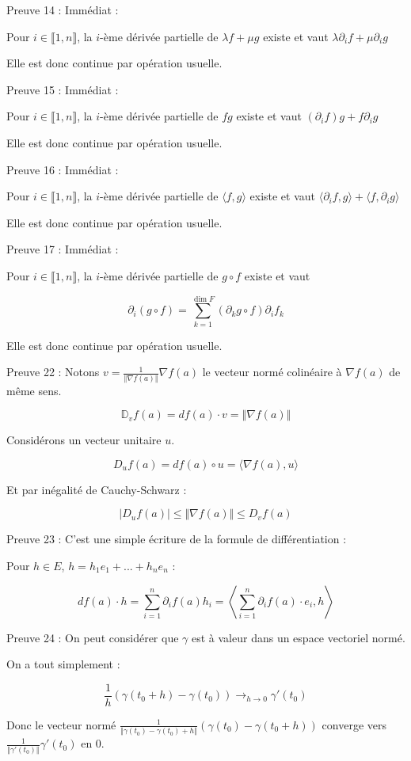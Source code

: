 \documentclass[a4paper,12pt]{book}
\newcommand{\Pre}[1]{\begin{tcolorbox}[sharp corners, colback=white,colframe=green!60!green!30!black!75, title=Preuve]#1\end{tcolorbox}}
\def\D{\mathbb{D}}
\begin{document}
\Pre{Preuve 14 : Immédiat : 
\par Pour $i\in\llbracket 1, n\rrbracket$, la $i$-ème dérivée partielle de $\lambda f+\mu g$ existe et vaut $\lambda\partial_if + \mu\partial_ig$
\par Elle est donc continue par opération usuelle.}
\Pre{Preuve 15 : Immédiat :
\par Pour $i\in\llbracket 1, n\rrbracket$, la $i$-ème dérivée partielle de $fg$ existe et vaut $(\partial_if)g + f\partial_ig$
\par Elle est donc continue par opération usuelle.}
\Pre{Preuve 16 : Immédiat :
\par Pour $i\in\llbracket 1, n\rrbracket$, la $i$-ème dérivée partielle de $\langle f,g\rangle$ existe et vaut $\langle \partial_if,g\rangle + \langle f,\partial_ig\rangle$
\par Elle est donc continue par opération usuelle.}
\Pre{Preuve 17 : Immédiat :
\par Pour $i\in\llbracket 1, n\rrbracket$, la $i$-ème dérivée partielle de $g\circ f$ existe et vaut
\par $$\partial_i (g\circ f) = \sum\limits_{k=1}^{\dim F} (\partial_kg\circ f)\partial_if_k$$
\par Elle est donc continue par opération usuelle.}
\Pre{Preuve 22 : Notons $v = \frac{1}{\Vert\nabla f(a)\Vert}\nabla f(a)$ le vecteur normé colinéaire à $\nabla f(a)$ de même sens.
\par $$\D_vf(a) = df(a)\cdot v = \Vert\nabla f(a)\Vert$$
\par Considérons un vecteur unitaire $u$.
\par $$D_uf(a) = df(a)\circ u = \langle \nabla f(a), u\rangle$$
\par Et par inégalité de Cauchy-Schwarz :
\par $$\vert D_uf(a)\vert\leq \Vert\nabla f(a)\Vert \leq D_vf(a)$$}
\Pre{Preuve 23 : C'est une simple écriture de la formule de différentiation :
\par Pour $h\in E$, $h= h_1e_1+...+h_ne_n$ :
\par $$df(a)\cdot h =\sum\limits_{i=1}^n\partial_if(a)h_i = \left\langle\sum\limits_{i=1}^n\partial_if(a)\cdot e_i, h\right\rangle$$}
\Pre{Preuve 24 : On peut considérer que $\gamma$ est à valeur dans un espace vectoriel normé.
\par On a tout simplement :
\par $$\frac{1}{h}(\gamma(t_0+h)-\gamma(t_0))\to_{h\to 0}\gamma'(t_0)$$
\par Donc le vecteur normé $\frac{1}{\Vert \gamma(t_0)-\gamma(t_0)+h\Vert}(\gamma(t_0)-\gamma(t_0+h))$ converge vers $\frac{1}{\Vert\gamma'(t_0)\Vert}\gamma'(t_0)$ en 0.}
\end{document}
